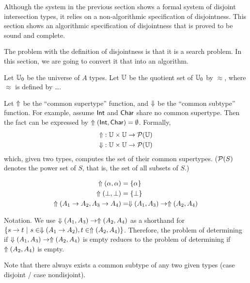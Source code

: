 Although the system in the previous section shows a formal system of
disjoint intersection types, it relies on a non-algorithmic
specification of disjointness. This section shows an algorithmic
specification of disjointness that is proved to be sound and complete.

The problem with the definition of disjointness is that it is a search problem. In this section, we are going to convert it that into an algorithm.

Let $\mathbb{U}_0$ be the universe of $A$ types. Let $\mathbb{U}$ be the quotient set of $\mathbb{U}_0$ by $\approx$, where $\approx$ is defined by \ldots.

Let $\Uparrow$ be the ``common supertype'' function, and $\Downarrow$ be the ``common subtype'' function. For example, assume $\textsf{Int}$ and $\textsf{Char}$ share no common supertype. Then the fact can be expressed by $\Uparrow(\textsf{Int},\textsf{Char})=\emptyset$. Formally,
\begin{align*}
  \Uparrow &: \mathbb{U} \times \mathbb{U} \to \mathcal{P}(\mathbb{U}) \\
  \Downarrow   &: \mathbb{U} \times \mathbb{U} \to \mathcal{P}(\mathbb{U})
\end{align*}
which, given two types, computes the set of their common supertypes. ($\mathcal{P}(S)$ denotes the power set of $S$, that is, the set of all subsets of $S$.)

\begin{align*}
  \Uparrow(\alpha,\alpha) &= \{ \alpha \} \\
  \Uparrow(\bot,\bot) &= \{ \bot \} \\
  \Uparrow(A_1 \to A_2, A_3 \to A_4) &= \Downarrow(A_1,A_3) \to \Uparrow(A_2,A_4) \\
\end{align*}

Notation. We use $\Downarrow(A_1,A_3) \to \Uparrow(A_2,A_4)$ as a shorthand for $\{ s \to t ~|~ s \in \Downarrow(A_1 \to A_2), t \in \Uparrow(A_2,A_4) \}$. Therefore, the problem of determining if $\Downarrow(A_1,A_3) \to \Uparrow(A_2,A_4)$ is empty reduces to the problem of determining if $\Uparrow(A_2,A_4)$ is empty.

Note that there always exists a common subtype of any two given types (case disjoint / case nondisjoint).

